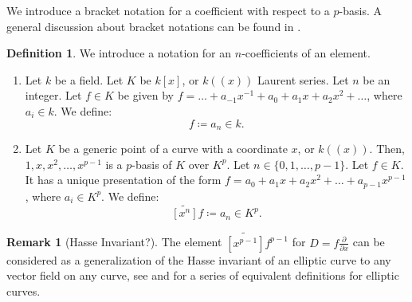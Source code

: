 \documentclass{amsart}
\theoremstyle{definition}
\newtheorem{defin}[thm]{Definition}
\newtheorem{remark}[thm]{Remark}
\begin{document}
We introduce a bracket notation for a coefficient with respect to a $p$-basis. A general discussion about bracket notations can be found in \cite{on_bracket_Knuth_1994}.

\begin{defin} We introduce a notation for an $n$-coefficients of an element.
\begin{enumerate}
    \item Let $k$ be a field. Let $K$ be $k[x]$, or $k((x))$ Laurent series. Let $n$ be an integer.
    Let $f\in K$ be given by $f=\ldots+a_{-1}x^{-1}+a_0+a_1x+a_2x^2+\ldots$, where $a_i\in k$. We define:
    \begin{equation}
        [x^{n}]f \coloneqq a_n \in k.
    \end{equation}
    \item Let $K$ be a generic point of a curve with a coordinate $x$, or $k((x))$.
    Then, $1,x,x^2,\ldots,x^{p-1}$ is a $p$-basis of $K$ over $K^p$.
    Let $n\in \{0,1,\ldots,p-1\}$. Let $f\in K$. It has a unique presentation of the form $f=a_0+a_1x+a_2x^2+\ldots+a_{p-1}x^{p-1}$, where $a_i\in K^p$. We define:
    \begin{equation}
        \widetilde{[x^{n}]}f \coloneqq a_n \in K^p.
    \end{equation}

\end{enumerate}
\end{defin}

\begin{remark}[Hasse Invariant?]
    The element $\widetilde{[x^{p-1}]}f^{p-1}$ for $D=f\frac{\partial}{\partial x}$ can be considered as a generalization of the Hasse invariant of an elliptic curve to any vector field on any curve, see \cite[Proposition 4.21]{Hartshorne77} and \cite[page 354]{Mazur_Katz_elliptic_curves} for a series of equivalent definitions for elliptic curves.
\end{remark}
\end{document}
